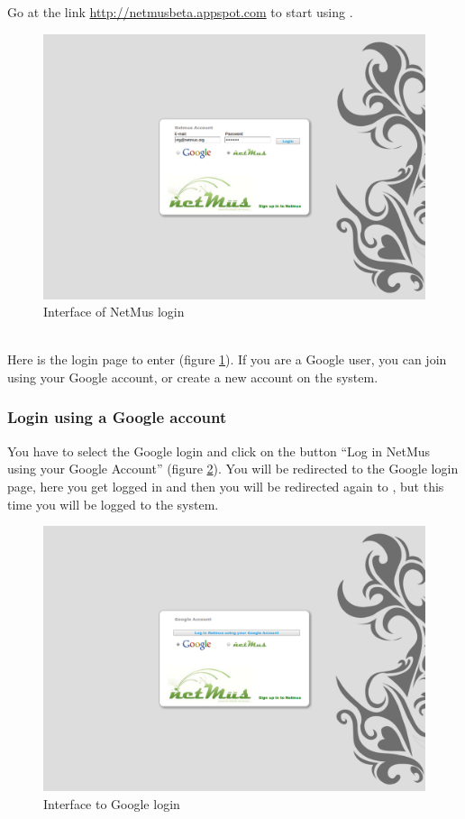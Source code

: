 Go at the link \url{http://netmusbeta.appspot.com} to start using .\\
\begin{figure}[!htbp]
  \centering
  \includegraphics[width=14cm]{img/MU/login.png}
\caption{Interface of NetMus login}
\label{fig:login}
\end{figure}
\\
Here is the login page to enter  (figure \ref{fig:login}). If you are
a Google user, you can join  using your Google account, or create a
new account on the system.

\subsubsection*{Login using a Google account}
You have to select the Google login and click on the button ``Log in
NetMus using your Google Account'' (figure \ref{fig:loginGoogle}). You will be
redirected to the Google login page, here you get logged in and then you will be redirected again to
, but this time you will be logged to the system.\\

\begin{figure}[!htbp]
  \centering
  \includegraphics[width=14cm]{img/MU/loginGoogle.png}
\caption{Interface to Google login}
\label{fig:loginGoogle}
\end{figure}

